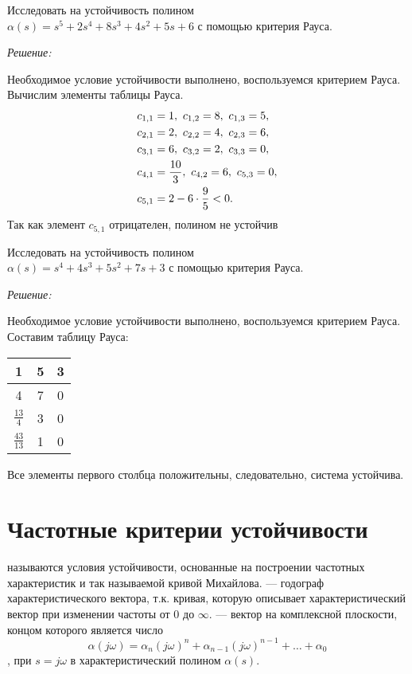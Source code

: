 \documentclass[../../TAU.tex]{subfiles}
\begin{document}
    \examp Исследовать на устойчивость полином\\
    $\alpha(s) = s^5+2s^4+8s^3+4s^2+5s+6$ 
    с помощью критерия Рауса.

    {\it Решение:}\par
    Необходимое условие устойчивости выполнено, воспользуемся критерием Рауса. Вычислим элементы таблицы Рауса.
    \begin{align*}
        c_{1,1}& = 1,\ c_{1,2} = 8,\ c_{1,3} = 5, \\
        c_{2,1}& = 2,\ c_{2,2} = 4,\ c_{2,3} = 6, \\
        c_{3,1}& = 6,\ c_{3,2} = 2,\ c_{3,3} = 0, \\
        c_{4,1}& = {10\over3},\ c_{4,2} = 6,\ c_{5,3} = 0, \\
        c_{5,1}& = 2-6\cdot{9\over5} < 0.
    \end{align*}
    Так как элемент $c_{5,1}$ отрицателен, полином не устойчив 


    \examp Исследовать на устойчивость полином\\
    $\alpha(s) = s^4+4s^3+5s^2+7s+3$ 
    с помощью критерия Рауса.

    {\it Решение:}\par
    Необходимое условие устойчивости выполнено, воспользуемся критерием Рауса. Составим таблицу Рауса:
    \begin{center}
        \begin{tabular}[h]{|c|c|c|}
            \hline
            1 & 5 & 3 \\
            \hline
            4 & 7 & 0 \\
            \hline
            $\frac{13}{4}$ & 3 & 0 \\
            \hline
            $\frac{43}{13}$ & 1 & 0 \\
            \hline
        \end{tabular}
    \end{center}
    Все элементы первого столбца положительны, следовательно, система устойчива.

\section{Частотные критерии устойчивости}

     называются условия устойчивости, основанные на построении частотных характеристик и так называемой кривой Михайлова.
     --- годограф характеристического вектора, т.к. кривая, которую описывает характеристический вектор при изменении частоты от $0$ до $\infty$.
     --- вектор на комплексной плоскости, концом которого является число 
    $$\alpha(j \omega)=\alpha_n(j \omega)^n+\alpha_{n-1}(j \omega)^{n-1}+\dots+\alpha_0$$, при $s=j \omega$ в характеристический полином $\alpha(s)$.
\end{document}
